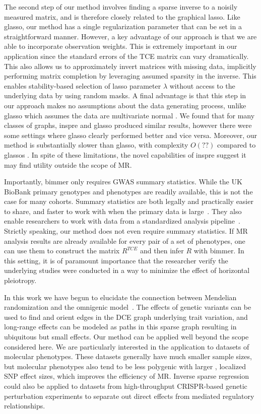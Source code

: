 \documentclass{article}
\begin{document}
The second step of our method involves finding a sparse inverse to a noisily measured
matrix, and is therefore closely related to the graphical lasso. Like glasso, our method
 has a single regularization parameter that can be set in a straightforward manner.
However, a key advantage of our approach is that we are able to incorporate
observation weights. This is extremely important in our application since the standard errors
of the TCE matrix can vary dramatically. This also allows us to approximately invert matrices
with missing data, implicitly performing matrix completion by leveraging assumed
sparsity in the inverse. This enables stability-based selection of lasso parameter $\lambda$ without access to the underlying data by using random masks.
A final advantage is that this step in our approach makes no
assumptions about the data generating process, unlike glasso which assumes the data are
multivariate normal . We found that for many classes of graphs,
inspre and glasso produced similar results, however there were some settings where glasso
clearly performed better and vice versa.
Moreover, our method is substantially slower than glasso, with
complexity $O(??)$ compared to glassos . In spite of these limitations,
the novel capabilities of inspre suggest it may find utility
outside the scope of MR.

Importantly, bimmer only requires GWAS summary statistics.
While the UK BioBank primary genotypes and phenotypes are readily available,
this is not the case for many cohorts. Summary
statistics are both legally and practically easier to share, and faster to work with when the primary
data is large~\cite{Pasaniuc2017}. They also enable researchers to work with data from a
standardized analysis pipeline~\cite{NealeUKBB}.
Strictly speaking, our method does not even require summary statistics. If
MR analysis results are already available for every pair of a set of phenotypes,
one can use them to construct the matrix $R^{TCE}$ and then infer $R$ with
bimmer. In this setting, it is of paramount importance that the researcher verify
the underlying studies were conducted in a way to minimize the effect of
horizontal pleiotropy.

In this work we have begun to elucidate the connection between Mendelian randomization
and the omnigenic model~\cite{Boyle2017}. The effects of genetic variants
can be used to find and orient edges
in the DCE graph underlying trait variation, and long-range effects can be modeled
as paths in this sparse graph resulting in ubiquitous but small effects.
 Our method can be applied well beyond the scope considered
here. We are particularly interested in the application to datasets of molecular phenotypes.
These datasets generally have much smaller sample sizes, but molecular phenotypes also
tend to be less polygenic with larger , localized SNP effect sizes, which improves the efficiency
of MR. Inverse sparse regression could also be applied to datasets from high-throughput CRISPR-based
genetic perturbation experiments to separate out direct effects from mediated regulatory relationships. 
\end{document}
